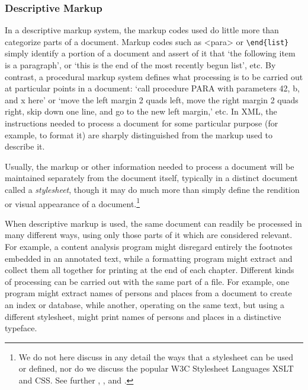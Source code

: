 \subsubsection[{Descriptive Markup}]{Descriptive Markup}\label{SG111}\par
In a descriptive markup system, the markup codes used do little more than categorize parts of a document. Markup codes such as <para> or \texttt{\textbackslash end\{list\}} simply identify a portion of a document and assert of it that ‘the following item is a paragraph’, or ‘this is the end of the most recently begun list’, etc. By contrast, a procedural markup system defines what processing is to be carried out at particular points in a document: ‘call procedure PARA with parameters 42, b, and x here’ or ‘move the left margin 2 quads left, move the right margin 2 quads right, skip down one line, and go to the new left margin,’ etc. In XML, the instructions needed to process a document for some particular purpose (for example, to format it) are sharply distinguished from the markup used to describe it.\par
Usually, the markup or other information needed to process a document will be maintained separately from the document itself, typically in a distinct document called a \textit{stylesheet}, though it may do much more than simply define the rendition or visual appearance of a document.\footnote{We do not here discuss in any detail the ways that a stylesheet can be used or defined, nor do we discuss the popular W3C Stylesheet Languages XSLT and CSS. See further \cite{XSL11}, \cite{XSLT}, and \cite{CSS1}.}\par
When descriptive markup is used, the same document can readily be processed in many different ways, using only those parts of it which are considered relevant. For example, a content analysis program might disregard entirely the footnotes embedded in an annotated text, while a formatting program might extract and collect them all together for printing at the end of each chapter. Different kinds of processing can be carried out with the same part of a file. For example, one program might extract names of persons and places from a document to create an index or database, while another, operating on the same text, but using a different stylesheet, might print names of persons and places in a distinctive typeface.
